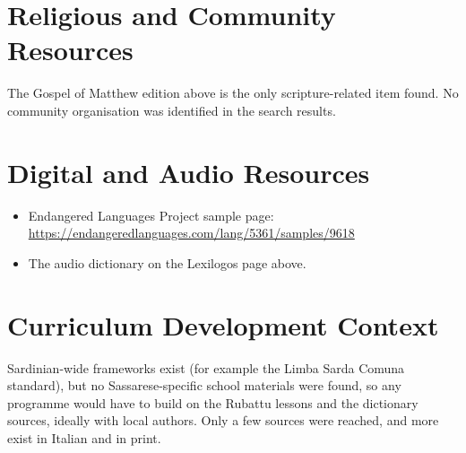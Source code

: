 \documentclass[12pt]{article}
\begin{document}
\section{Religious and Community Resources}
The Gospel of Matthew edition above is the only scripture-related item found. No community organisation was identified in the search results.

\section{Digital and Audio Resources}
\begin{itemize}
\item Endangered Languages Project sample page: \url{https://endangeredlanguages.com/lang/5361/samples/9618}
\item The audio dictionary on the Lexilogos page above.
\end{itemize}

\section{Curriculum Development Context}
Sardinian-wide frameworks exist (for example the Limba Sarda Comuna standard), but no Sassarese-specific school materials were found, so any programme would have to build on the Rubattu lessons and the dictionary sources, ideally with local authors. Only a few sources were reached, and more exist in Italian and in print.
\end{document}
